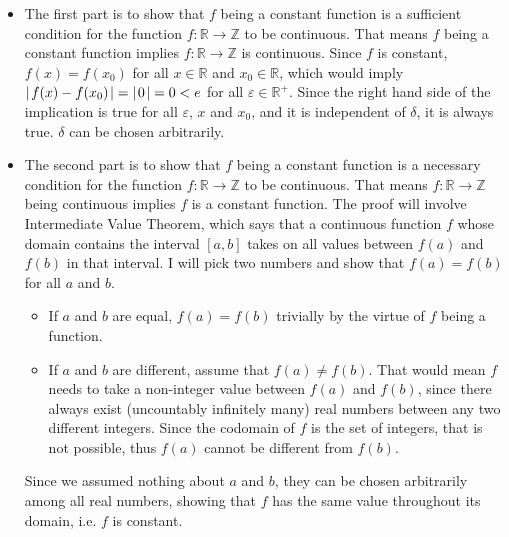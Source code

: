 \documentclass[12pt]{article}
\newcommand\+{\mkern2mu}
\let\eps\varepsilon
\begin{document}
\begin{itemize}
\item The first part is to show that $f$ being a constant function is a sufficient condition for the function $f: \mathbb{R} \rightarrow \mathbb{Z}$ to be continuous.
That means $f$ being a constant function implies $f: \mathbb{R} \rightarrow \mathbb{Z}$ is continuous.
Since $f$ is constant, $f(x) = f(x_0)$ for all $x \in \mathbb{R}$ and $x_0 \in \mathbb{R}$, which would imply $\vert \+ f(x) - f(x_0) \+ \vert = \vert \+ 0 \+ \vert = 0 < e$ for all $\eps \in \mathbb{R}^+$.
Since the right hand side of the implication is true for all $\eps$, $x$ and $x_0$, and it is independent of $\delta$, it is always true.
$\delta$ can be chosen arbitrarily.

\item The second part is to show that $f$ being a constant function is a necessary condition for the function $f: \mathbb{R} \rightarrow \mathbb{Z}$ to be continuous.
That means $f: \mathbb{R} \rightarrow \mathbb{Z}$ being continuous implies $f$ is a constant function.
The proof will involve Intermediate Value Theorem, which says that a continuous function $f$ whose domain contains the interval $[a, b]$ takes on all values between $f(a)$ and $f(b)$ in that interval.
I will pick two numbers and show that $f(a) = f(b)$ for all $a$ and $b$.
\begin{itemize}
\item If $a$ and $b$ are equal, $f(a) = f(b)$ trivially by the virtue of $f$ being a function.
\item If $a$ and $b$ are different, assume that $f(a) \neq f(b)$.
That would mean $f$ needs to take a non-integer value between $f(a)$ and $f(b)$, since there always exist (uncountably infinitely many) real numbers between any two different integers.
Since the codomain of $f$ is the set of integers, that is not possible, thus $f(a)$ cannot be different from $f(b)$.
\end{itemize}
Since we assumed nothing about $a$ and $b$, they can be chosen arbitrarily among all real numbers, showing that $f$ has the same value throughout its domain, i.e. $f$ is constant.


\end{itemize}
\end{document}
